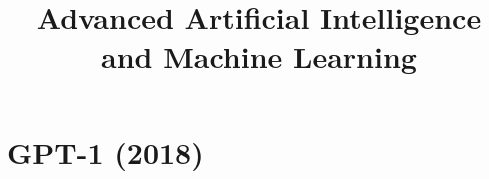 




\usepackage{animate}
\usepackage{xspace}
\newcommand{\citebutton}[2]{\beamergotobutton{\href{#2}{#1}}}
\newcommand{\ques}{\textbf{\textcolor{red}{Question:  }}}
\def\myblue#1{\textcolor{texblue}{#1}}
\newcommand{\blu}[1]{\textcolor{blue}{#1}}
\newcommand{\org}[1]{\textcolor{orange}{#1}}
\long{}
\newcommand\warning{%
 \makebox[1.4em][c]{%
 \makebox[0pt][c]{\raisebox{.1em}{\scriptsize!}}%
 \makebox[0pt][c]{\color{red}\normalsize$\bigtriangleup$}}}%

\def\cotpfull{chain-of-thought few-shot prompting\xspace}
\def\cotpfullcap{Chain-of-thought few-shot prompting\xspace}
\def\cotp{COT-FS-P\xspace}

\newcommand{\titlefigure}{figure/gptarch.png}
\newcommand{\learninggoals}{
  \item GPT-1 to GPT-3: generative pre-training, zero-/few-shot learning, capabilities and limitations
  \item Decoding: greedy and beam search, sampling strategies, decoding hyperparameters, evaluating generated text
  \item Fine-tuning and prompting: instruction tuning, multitask prompted training
  \item Chain-of-thought prompting and emergent abilities
  \item Reasoning models: DeepSeek-R1
}

\title{Advanced Artificial Intelligence and Machine Learning}
\date{}




\section{GPT-1 (2018)}

